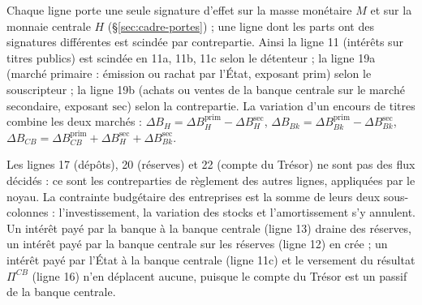 \documentclass[11pt,a4paper]{article}
\begin{document}
Chaque ligne porte une seule signature d'effet sur la masse monétaire $M$ et sur la monnaie centrale $H$ (\S\ref{sec:cadre-portes}) ; une ligne dont les parts ont des signatures différentes est scindée par contrepartie. Ainsi la ligne 11 (intérêts sur titres publics) est scindée en 11a, 11b, 11c selon le détenteur ; la ligne 19a (marché primaire : émission ou rachat par l'État, exposant $\mathrm{prim}$) selon le souscripteur ; la ligne 19b (achats ou ventes de la banque centrale sur le marché secondaire, exposant $\mathrm{sec}$) selon la contrepartie. La variation d'un encours de titres combine les deux marchés : $\Delta B_H = \Delta B_H^{\mathrm{prim}} - \Delta B_H^{\mathrm{sec}}$, $\Delta B_{\mathit{Bk}} = \Delta B_{\mathit{Bk}}^{\mathrm{prim}} - \Delta B_{\mathit{Bk}}^{\mathrm{sec}}$, $\Delta B_{\mathit{CB}} = \Delta B_{\mathit{CB}}^{\mathrm{prim}} + \Delta B_H^{\mathrm{sec}} + \Delta B_{\mathit{Bk}}^{\mathrm{sec}}$.

Les lignes 17 (dépôts), 20 (réserves) et 22 (compte du Trésor) ne sont pas des flux décidés : ce sont les contreparties de règlement des autres lignes, appliquées par le noyau. La contrainte budgétaire des entreprises est la somme de leurs deux sous-colonnes : l'investissement, la variation des stocks et l'amortissement s'y annulent. Un intérêt payé par la banque à la banque centrale (ligne 13) draine des réserves, un intérêt payé par la banque centrale sur les réserves (ligne 12) en crée ; un intérêt payé par l'État à la banque centrale (ligne 11c) et le versement du résultat $\Pi^{\mathit{CB}}$ (ligne 16) n'en déplacent aucune, puisque le compte du Trésor est un passif de la banque centrale.
\end{document}
